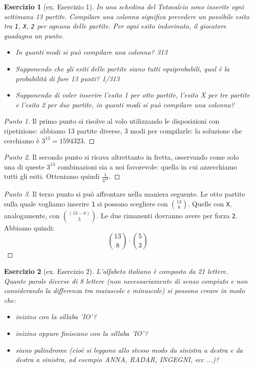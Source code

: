 \documentclass[12pt]{article}
\newtheorem{theorem}{Esercizio}
\renewcommand\qedsymbol{$\square$}
\begin{document}
\begin{theorem}[ex. Esercizio 1]
In una schedina del Totocalcio sono inserite ogni settimana 13 partite. Compilare una colonna significa prevedere un possibile esito tra \verb=1=, \verb=X=, \verb=2= per ognuna delle partite. Per ogni esito indovinato, il giocatore guadagna un punto.
\begin{itemize}
    \item In quanti modi si può compilare una colonna? 313
    \item Supponendo che gli esiti delle partite siano tutti equiprobabili, qual è la probabilità di fare 13 punti? 1/313
    \item Supponendo di voler inserire l’esito 1 per otto partite, l’esito X per tre partite e l’esito 2 per due partite, in quanti modi si può compilare una colonna?
\end{itemize}
\end{theorem}

\begin{proof}[Punto 1]
Il primo punto si risolve al volo utilizzando le disposizioni con ripetizione: abbiamo 13 partite diverse, 3 modi per compilarle: la soluzione che cerchiamo è $3^{13} = 1594323$.
\end{proof}

\renewcommand\qedsymbol{$\blacksquare$}

\begin{proof}[Punto 2]
Il secondo punto si ricava altrettanto in fretta, osservando come solo una di queste $3^{13}$ combinazioni sia a noi favorevole: quella in cui azzecchiamo tutti gli esiti. Otteniamo quindi $\frac{1}{3^{13}}$.
\end{proof}
\begin{proof}[Punto 3]
Il terzo punto si può affrontare nella maniera seguente. Le otto partite sulla quale vogliamo inserire \verb=1= si possono scegliere con ${13 \choose 8}$. Quelle con \verb=X=, analogamente, con ${(13 - 8) \choose 3}$. Le due rimanenti dovranno avere per forza \verb=2=. Abbiamo quindi:
$$
{13 \choose 8} \cdot {5 \choose 3}
$$
\end{proof}

\renewcommand\qedsymbol{$\square$}

\begin{theorem}[ex. Esercizio 2]
L’alfabeto italiano è composto da 21 lettere. Quante parole diverse di 8 lettere (non necessariamente di senso compiuto e non considerando la differenza tra maiuscole e minuscole) si possono creare in modo che:
\begin{itemize}
    \item inizino con la sillaba 'IO'?
    \item inizino oppure finiscano con la sillaba 'IO'? 
    \item siano palindrome (cioè si leggono allo stesso modo da sinistra a destra e da destra a sinistra, ad esempio ANNA, RADAR, INGEGNI, ecc ...)?
\end{itemize}
\end{theorem}
\end{document}
